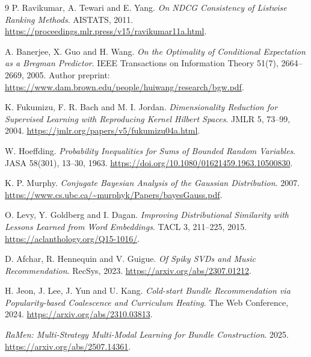 \documentclass[11pt,a4paper]{article}
\begin{document}
\clearpage
\begin{thebibliography}{9}
\small
{}
P. Ravikumar, A. Tewari and E. Yang.
\emph{On NDCG Consistency of Listwise Ranking Methods}. AISTATS, 2011.
\url{https://proceedings.mlr.press/v15/ravikumar11a.html}.

A. Banerjee, X. Guo and H. Wang.
\emph{On the Optimality of Conditional Expectation as a Bregman Predictor}.
IEEE Transactions on Information Theory 51(7), 2664--2669, 2005.
Author preprint: \url{https://www.dam.brown.edu/people/huiwang/research/bgw.pdf}.

K. Fukumizu, F. R. Bach and M. I. Jordan.
\emph{Dimensionality Reduction for Supervised Learning with Reproducing
Kernel Hilbert Spaces}. JMLR 5, 73--99, 2004.
\url{https://jmlr.org/papers/v5/fukumizu04a.html}.

W. Hoeffding.
\emph{Probability Inequalities for Sums of Bounded Random Variables}.
JASA 58(301), 13--30, 1963.
\url{https://doi.org/10.1080/01621459.1963.10500830}.

K. P. Murphy.
\emph{Conjugate Bayesian Analysis of the Gaussian Distribution}. 2007.
\url{https://www.cs.ubc.ca/~murphyk/Papers/bayesGauss.pdf}.

O. Levy, Y. Goldberg and I. Dagan.
\emph{Improving Distributional Similarity with Lessons Learned from Word
Embeddings}. TACL 3, 211--225, 2015.
\url{https://aclanthology.org/Q15-1016/}.

D. Afchar, R. Hennequin and V. Guigue.
\emph{Of Spiky SVDs and Music Recommendation}. RecSys, 2023.
\url{https://arxiv.org/abs/2307.01212}.

H. Jeon, J. Lee, J. Yun and U. Kang.
\emph{Cold-start Bundle Recommendation via Popularity-based Coalescence
and Curriculum Heating}. The Web Conference, 2024.
\url{https://arxiv.org/abs/2310.03813}.

\emph{RaMen: Multi-Strategy Multi-Modal Learning for Bundle Construction}.
2025. \url{https://arxiv.org/abs/2507.14361}.
\end{thebibliography}
\end{document}
